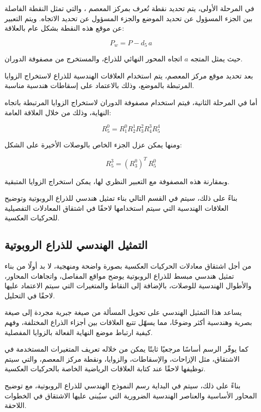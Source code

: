 في المرحلة الأولى، يتم تحديد نقطة تُعرف بمركز المعصم ، والتي تمثل النقطة الفاصلة بين الجزء المسؤول عن تحديد الموضع والجزء المسؤول عن تحديد الاتجاه. ويتم التعبير عن موقع هذه النقطة بشكل عام بالعلاقة:

\[
P_w = P - d_5 \, a
\]

حيث يمثل المتجه \(a\) اتجاه المحور النهائي للذراع، والمستخرج من مصفوفة الدوران.

بعد تحديد موقع مركز المعصم، يتم استخدام العلاقات الهندسية للذراع لاستخراج الزوايا المرتبطة بالموضع، وذلك بالاعتماد على إسقاطات هندسية مناسبة.

أما في المرحلة الثانية، فيتم استخدام مصفوفة الدوران لاستخراج الزوايا المرتبطة باتجاه النهاية، وذلك من خلال العلاقة العامة:

\[
R_5^0 = R_1^0 R_2^1 R_3^2 R_4^3 R_5^4
\]

ومنها يمكن عزل الجزء الخاص بالوصلات الأخيرة على الشكل:

\[
R_5^3 = (R_3^0)^T \, R_5^0
\]

وبمقارنة هذه المصفوفة مع التعبير النظري لها، يمكن استخراج الزوايا المتبقية.

بناءً على ذلك، سيتم في القسم التالي بناء تمثيل هندسي للذراع الروبوتية وتوضيح العلاقات الهندسية التي سيتم استخدامها لاحقًا في اشتقاق المعادلات التفصيلية للحركيات العكسية.



\subsection{التمثيل الهندسي للذراع الروبوتية}

من أجل اشتقاق معادلات الحركيات العكسية بصورة واضحة ومنهجية، لا بد أولًا من بناء تمثيل هندسي مبسط للذراع الروبوتية يوضح مواقع المفاصل، واتجاهات المحاور، والأطوال الهندسية للوصلات، بالإضافة إلى النقاط والمتغيرات التي سيتم الاعتماد عليها لاحقًا في التحليل.

يساعد هذا التمثيل الهندسي على تحويل المسألة من صيغة جبرية مجردة إلى صيغة بصرية وهندسية أكثر وضوحًا، مما يسهّل تتبع العلاقات بين أجزاء الذراع المختلفة، وفهم كيفية ارتباط موضع النهاية الفعالة بالزوايا المفصلية.

كما يوفّر الرسم أساسًا مرجعيًا ثابتًا يمكن من خلاله تعريف المتغيرات المستخدمة في الاشتقاق، مثل الإزاحات، والإسقاطات، والزوايا، ونقطة مركز المعصم، والتي سيتم توظيفها لاحقًا عند كتابة العلاقات الرياضية الخاصة بالحركيات العكسية.

بناءً على ذلك، سيتم في البداية رسم النموذج الهندسي للذراع الروبوتية، مع توضيح المحاور الأساسية والعناصر الهندسية الضرورية التي سيُبنى عليها الاشتقاق في الخطوات اللاحقة.

